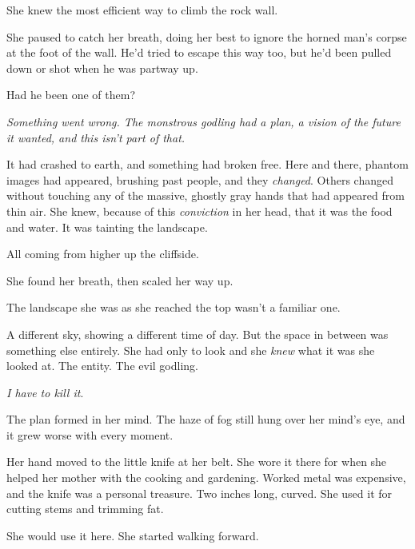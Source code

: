 She knew the most efficient way to climb the rock wall.



She paused to catch her breath, doing her best to ignore the horned man's corpse at the foot of the wall.  He'd tried to escape this way too, but he'd been pulled down or shot when he was partway up.



Had he been one of them?



\emph{Something went wrong.  The monstrous godling had a plan, a vision of the future it wanted, and this isn't part of that.}



It had crashed to earth, and something had broken free.  Here and there, phantom images had appeared, brushing past people, and they \emph{changed}.  Others changed without touching any of the massive, ghostly gray hands that had appeared from thin air.  She knew, because of this \emph{conviction} in her head, that it was the food and water.  It was tainting the landscape.



All coming from higher up the cliffside.



She found her breath, then scaled her way up.



The landscape she was as she reached the top wasn't a familiar one.



A different sky, showing a different time of day.  But the space in between was something else entirely.  She had only to look and she \emph{knew} what it was she looked at.  The entity.  The evil godling.



\emph{I have to kill it}.



The plan formed in her mind.  The haze of fog still hung over her mind's eye, and it grew worse with every moment.



Her hand moved to the little knife at her belt.  She wore it there for when she helped her mother with the cooking and gardening.  Worked metal was expensive, and the knife was a personal treasure.  Two inches long, curved.  She used it for cutting stems and trimming fat.



She would use it here.  She started walking forward.



